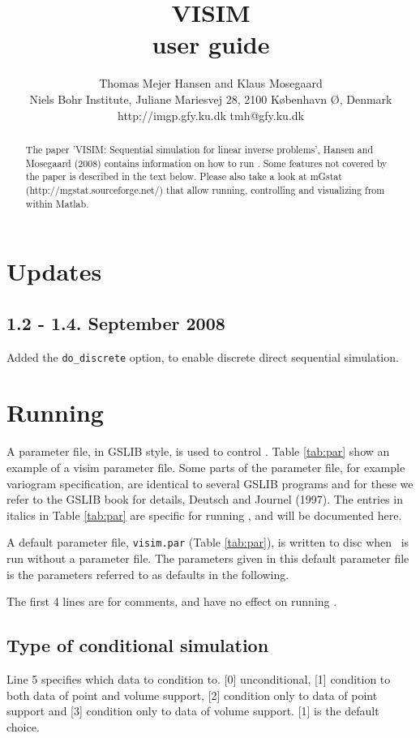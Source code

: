 \documentclass[12t]{article}
\title{VISIM\\user guide}
\author{Thomas Mejer Hansen and Klaus Mosegaard\\
Niels Bohr Institute, Juliane Mariesvej 28, 2100 K\o benhavn \O, Denmark\\
http://imgp.gfy.ku.dk tmh@gfy.ku.dk}
\begin{document}
\maketitle

\begin{abstract}
The paper 'VISIM: Sequential simulation for linear inverse problems', Hansen and Mosegaard (2008) contains information on how to run \visimprog. Some features not covered by the paper is described in the text below. Please also take a look at mGstat (http://mgstat.sourceforge.net/) that allow running, controlling and visualizing \visimprog from within Matlab.
\end{abstract}


\section{Updates}
\subsection{1.2 - 1.4. September 2008}
Added the \texttt{do\_discrete} option, to enable discrete direct sequential simulation.


\section{Running \visimprog}
\label{sec:running}
A parameter file, in GSLIB style, is used to control \visimprog. Table
\ref{tab:par} show an example of a visim parameter file. Some parts of
the parameter file, for example variogram specification, are identical
to several GSLIB programs and for these we refer to the GSLIB book for
details, Deutsch and Journel (1997). 
The entries in italics in Table \ref{tab:par} are specific for running \visimprog, and will be documented here.

A default parameter file, \texttt{visim.par} (Table \ref{tab:par}), is written to disc when
\visimprog~is run without a parameter file. The parameters given in this default parameter file is the parameters referred to as defaults in the following.

The first 4 lines are for comments, and have no effect on running \visimprog.

\subsection{Type of conditional simulation}
Line 5 specifies which data to condition to. [0] unconditional, [1]
condition to both data of point and volume support, [2] condition only
to data of point support and [3] condition only to data of volume support. 
[1] is the default choice.
\end{document}
